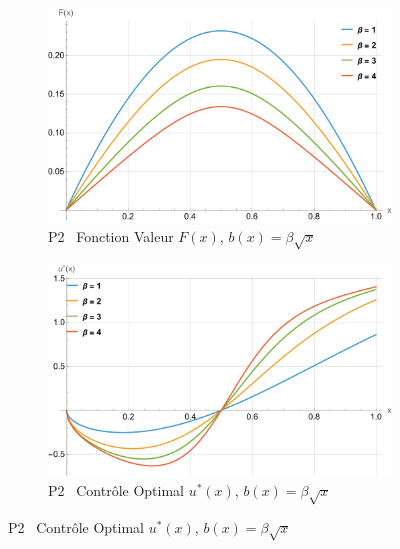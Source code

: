 \begin{figure}[htb]
    \begin{subfigure}{0.49\linewidth}
        \includegraphics[width=\linewidth]{img/validation/P2/p2_B_value.pdf}
        \caption{P2 \textemdash~Fonction Valeur $F(x)$, $b(x)=\beta \sqrt{x}$}\label{fig:BetaValueVisualisation2}
    \end{subfigure}
    \hfill
    \begin{subfigure}{0.49\linewidth}
        \includegraphics[width=\linewidth]{img/validation/P2/p2_B_control.pdf}
        \caption{P2 \textemdash~Contrôle Optimal $u^*(x)$, $b(x)=\beta \sqrt{x}$}\label{fig:BetaControlVisualisation2}
    \end{subfigure}


\end{figure}

